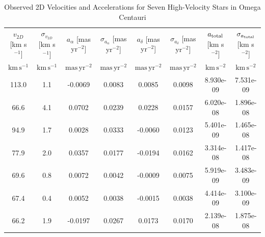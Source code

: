 \begin{table}[htbp]
\caption{Observed 2D Velocities and Accelerations for Seven High-Velocity Stars in Omega Centauri}
\begin{tabular}{cccccccc}
\hline
$v_{2D}$ [km s$^{-1}$] & $\sigma_{v_{2D}}$ [km s$^{-1}$] & $a_{\alpha}$ [mas yr$^{-2}$] & $\sigma_{a_{\alpha}}$ [mas yr$^{-2}$] & $a_{\delta}$ [mas yr$^{-2}$] & $\sigma_{a_{\delta}}$ [mas yr$^{-2}$] & $a_{\rm total}$ [km s$^{-2}$] & $\sigma_{a_{\rm total}}$ [km s$^{-2}$] \\
$\mathrm{km\,s^{-1}}$ & $\mathrm{km\,s^{-1}}$ & $\mathrm{mas\,yr^{-2}}$ & $\mathrm{mas\,yr^{-2}}$ & $\mathrm{mas\,yr^{-2}}$ & $\mathrm{mas\,yr^{-2}}$ & $\mathrm{km\,s^{-2}}$ & $\mathrm{km\,s^{-2}}$ \\
\hline
113.0 & 1.1 & -0.0069 & 0.0083 & 0.0085 & 0.0098 & 8.930e-09 & 7.531e-09 \\
66.6 & 4.1 & 0.0702 & 0.0239 & 0.0228 & 0.0157 & 6.020e-08 & 1.896e-08 \\
94.9 & 1.7 & 0.0028 & 0.0333 & -0.0060 & 0.0123 & 5.401e-09 & 1.465e-08 \\
77.9 & 2.0 & 0.0357 & 0.0177 & -0.0194 & 0.0162 & 3.314e-08 & 1.417e-08 \\
69.6 & 0.8 & 0.0072 & 0.0042 & -0.0009 & 0.0075 & 5.919e-09 & 3.483e-09 \\
67.4 & 0.4 & 0.0052 & 0.0038 & -0.0015 & 0.0038 & 4.414e-09 & 3.100e-09 \\
66.2 & 1.9 & -0.0197 & 0.0267 & 0.0173 & 0.0170 & 2.139e-08 & 1.875e-08 \\
\hline
\end{tabular}
\end{table}
